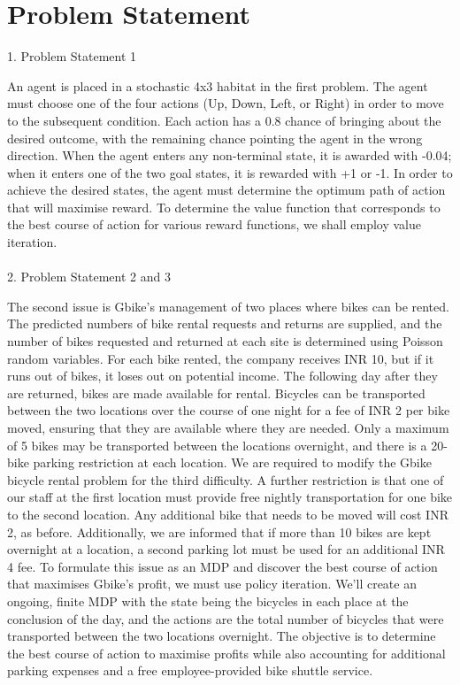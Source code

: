 \documentclass[conference]{IEEEtran}
\begin{document}
\section{Problem Statement}
1. Problem Statement 1

An agent is placed in a stochastic 4x3 habitat in the first problem. The agent must choose one of the four actions (Up, Down, Left, or Right) in order to move to the subsequent condition. Each action has a 0.8 chance of bringing about the desired outcome, with the remaining chance pointing the agent in the wrong direction. When the agent enters any non-terminal state, it is awarded with -0.04; when it enters one of the two goal states, it is rewarded with +1 or -1. In order to achieve the desired states, the agent must determine the optimum path of action that will maximise reward. To determine the value function that corresponds to the best course of action for various reward functions, we shall employ value iteration.
\\ \\
2. Problem Statement 2 and 3

The second issue is Gbike's management of two places where bikes can be rented. The predicted numbers of bike rental requests and returns are supplied, and the number of bikes requested and returned at each site is determined using Poisson random variables.
For each bike rented, the company receives INR 10, but if it runs out of bikes, it loses out on potential income. The following day after they are returned, bikes are made available for rental. Bicycles can be transported between the two locations over the course of one night for a fee of INR 2 per bike moved, ensuring that they are available where they are needed. Only a maximum of 5 bikes may be transported between the locations overnight, and there is a 20-bike parking restriction at each location. We are required to modify the Gbike bicycle rental problem for the third difficulty. A further restriction is that one of our staff at the first location must provide free nightly transportation for one bike to the second location. Any additional bike that needs to be moved will cost INR 2, as before. Additionally, we are informed that if more than 10 bikes are kept overnight at a location, a second parking lot must be used for an additional INR 4 fee. To formulate this issue as an MDP and discover the best course of action that maximises Gbike's profit, we must use policy iteration.
We'll create an ongoing, finite MDP with the state being the bicycles in each place at the conclusion of the day, and the actions are the total number of bicycles that were transported between the two locations overnight. The objective is to determine the best course of action to maximise profits while also accounting for additional parking expenses and a free employee-provided bike shuttle service.
\\ \\ \\ \\ \\ \\ \\ \\ \\
\end{document}
